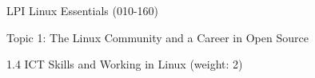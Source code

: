 LPI Linux Essentials (010-160)

Topic 1: The Linux Community and a Career in Open Source

1.4 ICT Skills and Working in Linux (weight: 2)

